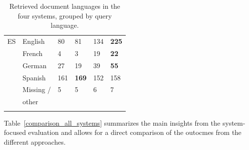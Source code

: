 \documentclass[a4paper,11pt]{article}
\begin{document}
\begin{table}[ht]
\begin{tabularx}{0.81\textwidth}{llllll}
ES & English & 80 & 81 & 134 & \textbf{225} \\
\addlinespace
& French & 4 & 3 & 19 & \textbf{22} \\
\addlinespace
& German & 27 & 19 & 39 & \textbf{55} \\
\addlinespace
& Spanish & 161 & \textbf{169} & 152 & 158 \\
\addlinespace
& Missing / & 5 & 5 & 6 & 7 \\
& other &&&& \\
\addlinespace
\bottomrule
\end{tabularx}
\caption{Retrieved document languages in the four systems, grouped by query language.}
\label{tab:grouped_by_language}
\end{table}

Table~\ref{comparison_all_systems} summarizes the main insights from the system-focused evaluation and allows for a direct comparison of the outocmes from the different approaches.
\end{document}
